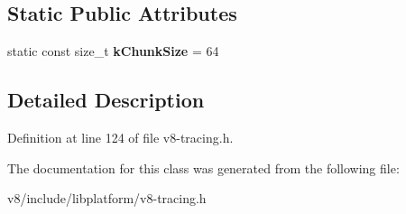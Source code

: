 \subsection*{Static Public Attributes}
\begin{DoxyCompactItemize}
\item 
\mbox{\label{classv8_1_1platform_1_1tracing_1_1TraceBufferChunk_a7a71bfc9c633266ce12a28cb009a2b1f}} 
static const size\+\_\+t {\bfseries k\+Chunk\+Size} = 64
\end{DoxyCompactItemize}


\subsection{Detailed Description}


Definition at line 124 of file v8-\/tracing.\+h.



The documentation for this class was generated from the following file\+:\begin{DoxyCompactItemize}
\item 
v8/include/libplatform/v8-\/tracing.\+h\end{DoxyCompactItemize}
